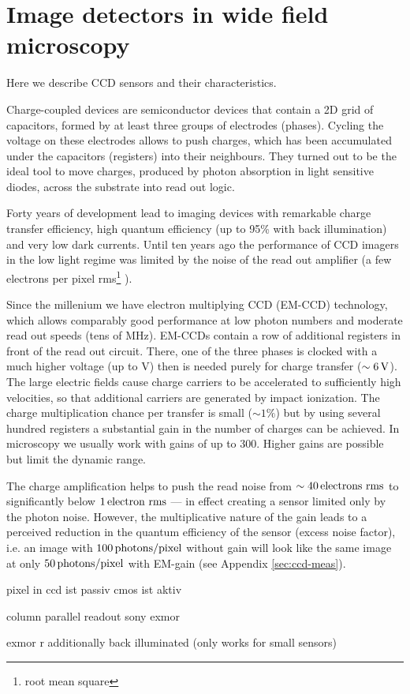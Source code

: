 \section{Image detectors in wide field microscopy}
\label{sec:ccd-intro}
\begin{summary}
  Here we describe CCD
  sensors and their characteristics.
\end{summary}
Charge-coupled devices are semiconductor devices that contain a 2D
grid of capacitors, formed by at least three groups of electrodes
(phases). Cycling the voltage on these electrodes allows to push
charges, which has been accumulated under the capacitors (registers)
into their neighbours. They turned out to be the ideal tool to move
charges, produced by photon absorption in light sensitive diodes,
across the substrate into read out logic.

Forty years of development lead to imaging devices with remarkable
charge transfer efficiency, high quantum efficiency (up to 95\% with
back illumination) and very low dark currents. Until ten years ago the
performance of CCD imagers in the low light regime was limited by the
noise of the read out amplifier (a few electrons per pixel
rms\footnote{root mean square} ).

Since the millenium we have electron multiplying CCD (EM-CCD)
 technology,
which allows comparably good performance at low photon numbers
\citep{Mackay,Robbins2003} and moderate read out speeds (tens of
MHz). EM-CCDs contain a row of additional registers in front of the
read out circuit. There, one of the three phases is clocked with a
much higher voltage (up to \unit[40]{V}) then is needed purely for
charge transfer ($\unit[\sim6]{V}$). The large electric fields cause
charge carriers to be accelerated to sufficiently high velocities, so
that additional carriers are generated by impact ionization. The
charge multiplication chance per transfer is small ($\sim1\%$) but by
using several hundred registers a substantial gain in the number of
charges can be achieved. In microscopy we usually work with gains of
up to 300. Higher gains are possible but limit the dynamic range.

The charge amplification helps to push the read noise from
$\sim\unit[40]{electrons\ rms}$ to significantly below
$\unit[1]{electron\ rms}$ --- in effect creating a sensor limited only
by the photon noise. However, the multiplicative nature of the gain
leads to a perceived reduction in the quantum efficiency of the sensor
(excess noise factor), i.e. an image with $\unit[100]{photons/pixel}$
without gain will look like the same image at only
$\unit[50]{photons/pixel}$ with EM-gain (see Appendix
\ref{sec:ccd-meas}).


pixel in
ccd ist passiv
cmos ist aktiv

column parallel readout sony exmor

exmor r additionally back illuminated (only works for small sensors)